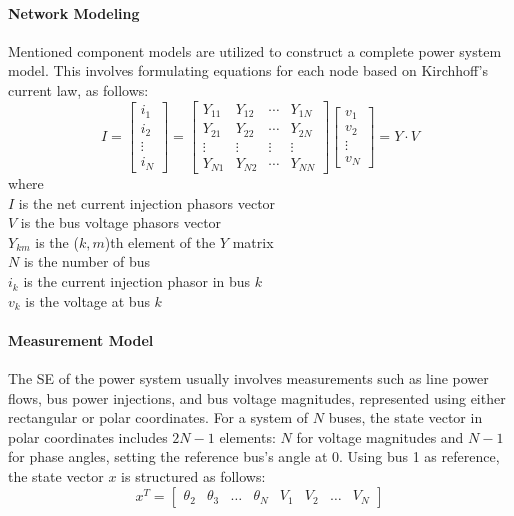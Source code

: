 \paragraph{Network Modeling}
Mentioned component models are utilized to construct a complete power system model. This involves formulating equations for each node based on Kirchhoff's current law, as follows:
\begin{equation}
    I=\left[\begin{array}{c}
i_{1} \\
i_{2} \\
\vdots \\
i_{N}
\end{array}\right]=\left[\begin{array}{cccc}
Y_{11} & Y_{12} & \cdots & Y_{1 N} \\
Y_{21} & Y_{22} & \cdots & Y_{2 N} \\
\vdots & \vdots & \vdots & \vdots \\
Y_{N 1} & Y_{N 2} & \cdots & Y_{N N}
\end{array}\right]\left[\begin{array}{c}
v_{1} \\
v_{2} \\
\vdots \\
v_{N}
\end{array}\right]=Y \cdot V
\end{equation}
where \\ 
$I$ is the net current injection phasors vector\\
$V$ is the bus voltage phasors vector\\  
$Y_{km}$ is the ($k,m$)th element of the $Y$ matrix\\ 
$N$ is the number of bus\\
$i_k$ is the current injection phasor in bus $k$\\
$v_k$ is the voltage at bus $k$

\paragraph{Measurement Model}
The SE of the power system usually involves measurements such as line power flows, bus power injections, and bus voltage magnitudes, represented using either rectangular or polar coordinates. For a system of $N$ buses, the state vector in polar coordinates includes \(2N-1\) elements: $N$ for voltage magnitudes and \(N-1\) for phase angles, setting the reference bus's angle at 0. Using bus 1 as reference, the state vector $x$ is structured as follows:
\begin{equation}
    x^{T}=\left[\begin{array}{llllllll}
\theta_{2} & \theta_{3} & \ldots & \theta_{N} & V_{1} & V_{2} & \ldots & V_{N}
\end{array}\right]
\end{equation}

